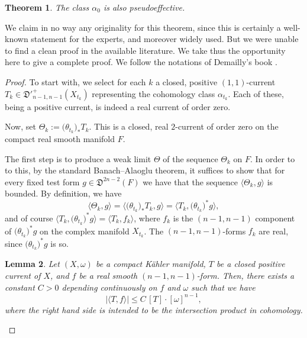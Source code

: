 \documentclass[JEP,XML,SOM,Unicode,NoEqCountersInSection,published]{cedram}
\theoremstyle{plain}
\newtheorem{theorem}{Theorem}[section]
\newtheorem{lemma}[theorem]{Lemma}
\theoremstyle{definition}
\begin{document}
\begin{appendix}
\begin{theorem} \label{limitpseff}
The class $\alpha_0$ is also pseudoeffective.
\end{theorem}

We claim in no way any originality for this theorem, since this is certainly a well-known statement for the experts, and moreover widely used. But we were unable to find a clean proof in the available literature. We take thus the opportunity here to give a complete proof. We follow the notations of Demailly's book \cite{Dem12}.

\begin{proof}
To start with, we select for each $k$ a closed, positive $(1,1)$-current $T_{k}\in\mathfrak D'^+_{n-1,n-1}(X_{t_k})$ representing the cohomology class $\alpha_{t_k}$. Each of these, being a positive current, is indeed a real current of order zero.

Now, set $\Theta_{k}:=\bigl(\theta_{t_k}\bigr)_*T_k$. This is a closed, real $2$-current of order zero on the compact real smooth manifold $F$.

The first step is to produce a weak limit $\Theta$ of the sequence $\Theta_k$ on $F$. In order to to this, by the standard Banach--Alaoglu theorem, it suffices to show that for every fixed test form $g\in\mathfrak D^{2n-2}(F)$ we have that the sequence $\langle \Theta_k,g\rangle$ is bounded. By definition, we have
\[
\langle \Theta_k,g\rangle= \bigl\langle \bigl(\theta_{t_k}\bigr)_*T_k,g\bigr\rangle=\bigl\langle T_k,\bigl(\theta_{t_k}\bigr)^*g\bigr\rangle,
\]
and of course $\bigl\langle T_k,\bigl(\theta_{t_k}\bigr)^*g\bigr\rangle=\langle T_k,f_k\rangle$, where $f_k$ is the $(n-1,n-1)$ component of $\bigl(\theta_{t_k}\bigr)^*g$ on the complex manifold $X_{t_k}$. The $(n-1,n-1)$-forms $f_k$ are real, since $\bigl(\theta_{t_k}\bigr)^*g$ is so.

\begin{lemma}
Let $(X,\omega)$ be a compact Kähler manifold, $T$ be a closed positive current of $X$, and $f$ be a real smooth $(n-1,n-1)$-form. Then, there exists a constant $C>0$ depending continuously on $f$ and $\omega$ such that we have
\[
|\langle T, f\rangle|\le C\, [T]\cdot[\omega]^{n-1},
\]
where the right hand side is intended to be the intersection product in cohomology.
\end{lemma}


\end{proof}
\end{appendix}
\end{document}
